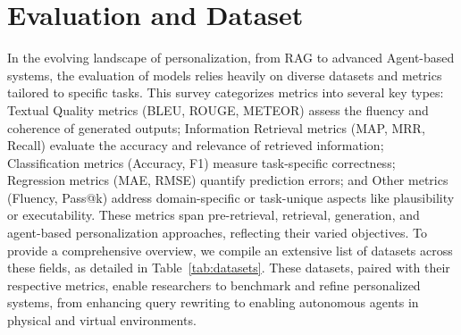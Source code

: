 \section{Evaluation and Dataset}\label{sec:evaluation&dataset}

In the evolving landscape of personalization, from RAG to advanced Agent-based systems, the evaluation of models relies heavily on diverse datasets and metrics tailored to specific tasks. This survey categorizes metrics into several key types: Textual Quality metrics (\eg BLEU, ROUGE, METEOR) assess the fluency and coherence of generated outputs; Information Retrieval metrics (\eg MAP, MRR, Recall) evaluate the accuracy and relevance of retrieved information; Classification metrics (\eg Accuracy, F1) measure task-specific correctness; Regression metrics (\eg MAE, RMSE) quantify prediction errors; and Other metrics (\eg Fluency, Pass@k) address domain-specific or task-unique aspects like plausibility or executability. These metrics span pre-retrieval, retrieval, generation, and agent-based personalization approaches, reflecting their varied objectives. To provide a comprehensive overview, we compile an extensive list of datasets across these fields, as detailed in Table~\ref{tab:datasets}. These datasets, paired with their respective metrics, enable researchers to benchmark and refine personalized systems, from enhancing query rewriting to enabling autonomous agents in physical and virtual environments.